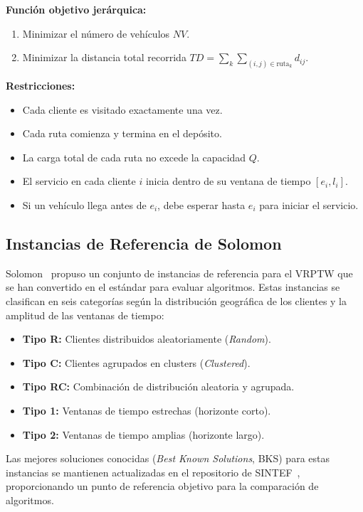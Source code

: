 \documentclass[12pt, letterpaper]{article}
\begin{document}
\textbf{Función objetivo jerárquica:}
\begin{enumerate}[leftmargin=2cm]
  \item Minimizar el número de vehículos $NV$.
  \item Minimizar la distancia total recorrida $TD = \sum_{k} \sum_{(i,j) \in \text{ruta}_k} d_{ij}$.
\end{enumerate}

\textbf{Restricciones:}
\begin{itemize}[leftmargin=2cm]
  \item Cada cliente es visitado exactamente una vez.
  \item Cada ruta comienza y termina en el depósito.
  \item La carga total de cada ruta no excede la capacidad $Q$.
  \item El servicio en cada cliente $i$ inicia dentro de su ventana de tiempo $[e_i, l_i]$.
  \item Si un vehículo llega antes de $e_i$, debe esperar hasta $e_i$ para iniciar el servicio.
\end{itemize}

\subsection{Instancias de Referencia de Solomon}
\label{subsec:solomon_benchmarks}

Solomon~\cite{solomon1987} propuso un conjunto de instancias de referencia para el VRPTW que se han convertido en el estándar para evaluar algoritmos. Estas instancias se clasifican en seis categorías según la distribución geográfica de los clientes y la amplitud de las ventanas de tiempo:

\begin{itemize}[leftmargin=2cm]
  \item \textbf{Tipo R:} Clientes distribuidos aleatoriamente (\textit{Random}).
  \item \textbf{Tipo C:} Clientes agrupados en clusters (\textit{Clustered}).
  \item \textbf{Tipo RC:} Combinación de distribución aleatoria y agrupada.
  \item \textbf{Tipo 1:} Ventanas de tiempo estrechas (horizonte corto).
  \item \textbf{Tipo 2:} Ventanas de tiempo amplias (horizonte largo).
\end{itemize}

Las mejores soluciones conocidas (\textit{Best Known Solutions}, BKS) para estas instancias se mantienen actualizadas en el repositorio de SINTEF~\cite{sintef2024}, proporcionando un punto de referencia objetivo para la comparación de algoritmos.
\end{document}
